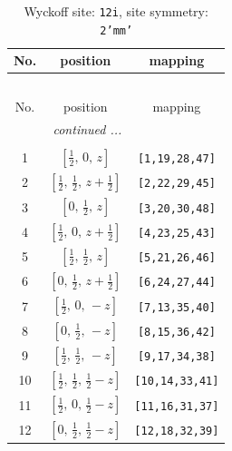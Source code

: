 \documentclass[fleqn,8pt]{jsarticle}
\begin{document}
\begin{longtable}{ccc}
\caption{Wyckoff site: {\tt 12i}, site symmetry: {\tt 2'mm'}}
 \\
 \hline \hline
No. & position & mapping \\ \hline \endfirsthead

\multicolumn{2}{l}{\tablename\ \thetable{}} \\
 \hline \hline
No. & position & mapping \\ \hline \endhead

 \hline \hline
\multicolumn{2}{r}{\footnotesize\it continued ...} \\ \endfoot

 \hline \hline
\multicolumn{2}{r}{} \\ \endlastfoot

1 & $\left[ \frac{1}{2},\, 0,\, z \right]$ & {\tt [1,19,28,47]} \\ \hline
2 & $\left[ \frac{1}{2},\, \frac{1}{2},\, z + \frac{1}{2} \right]$ & {\tt [2,22,29,45]} \\ \hline
3 & $\left[ 0,\, \frac{1}{2},\, z \right]$ & {\tt [3,20,30,48]} \\ \hline
4 & $\left[ \frac{1}{2},\, 0,\, z + \frac{1}{2} \right]$ & {\tt [4,23,25,43]} \\ \hline
5 & $\left[ \frac{1}{2},\, \frac{1}{2},\, z \right]$ & {\tt [5,21,26,46]} \\ \hline
6 & $\left[ 0,\, \frac{1}{2},\, z + \frac{1}{2} \right]$ & {\tt [6,24,27,44]} \\ \hline
7 & $\left[ \frac{1}{2},\, 0,\, - z \right]$ & {\tt [7,13,35,40]} \\ \hline
8 & $\left[ 0,\, \frac{1}{2},\, - z \right]$ & {\tt [8,15,36,42]} \\ \hline
9 & $\left[ \frac{1}{2},\, \frac{1}{2},\, - z \right]$ & {\tt [9,17,34,38]} \\ \hline
10 & $\left[ \frac{1}{2},\, \frac{1}{2},\, \frac{1}{2} - z \right]$ & {\tt [10,14,33,41]} \\ \hline
11 & $\left[ \frac{1}{2},\, 0,\, \frac{1}{2} - z \right]$ & {\tt [11,16,31,37]} \\ \hline
12 & $\left[ 0,\, \frac{1}{2},\, \frac{1}{2} - z \right]$ & {\tt [12,18,32,39]} \\
\end{longtable}
\renewcommand{\arraystretch}{1.2}
\end{document}
